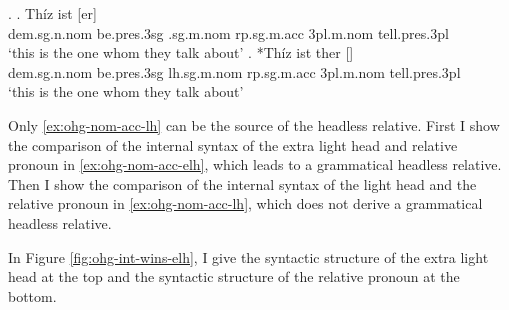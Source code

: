 \ex.\label{ex:ohg-nom-acc-rep}
\ag. Thíz ist [er]   \\
\ac{dem}.\ac{sg}.\ac{n}.\ac{nom} be.\ac{pres}.3\ac{sg}\scsub{[nom]} .\ac{sg}.\ac{m}.\ac{nom} \ac{rp}.\ac{sg}.\ac{m}.\ac{acc} 3\ac{pl}.\ac{m}.\ac{nom} tell.\ac{pres}.3\ac{pl}\scsub{[acc]}\\
`this is the one whom they talk about' \label{ex:ohg-nom-acc-elh}
\bg. *Thíz ist ther []  \\
\ac{dem}.\ac{sg}.\ac{n}.\ac{nom} be.\ac{pres}.3\ac{sg}\scsub{[nom]} \ac{lh}.\ac{sg}.\ac{m}.\ac{nom} \ac{rp}.\ac{sg}.\ac{m}.\ac{acc} 3\ac{pl}.\ac{m}.\ac{nom} tell.\ac{pres}.3\ac{pl}\scsub{[acc]}\\
`this is the one whom they talk about' \label{ex:ohg-nom-acc-lh}

Only \ref{ex:ohg-nom-acc-lh} can be the source of the headless relative. First I show the comparison of the internal syntax of the extra light head and relative pronoun in \ref{ex:ohg-nom-acc-elh}, which leads to a grammatical headless relative. Then I show the comparison of the internal syntax of the light head and the relative pronoun in \ref{ex:ohg-nom-acc-lh}, which does not derive a grammatical headless relative.

In Figure \ref{fig:ohg-int-wins-elh}, I give the syntactic structure of the extra light head at the top and the syntactic structure of the relative pronoun at the bottom.

